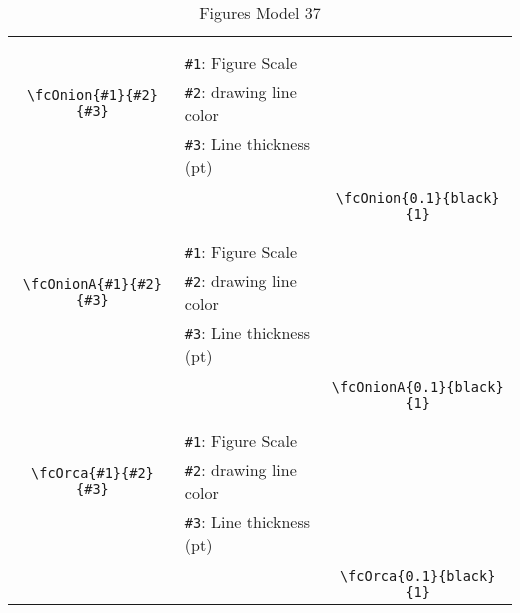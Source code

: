 \documentclass[x11names]{article}
\begin{document}
\begin{table}[H]
\begin{tabular}{|c|l|c|}
	&&\multirow{5}{*}{\fcOnion{0.1}{black}{1}}\\	&&\\	&\verb|#1|: Figure Scale &\\	\verb|\fcOnion{#1}{#2}{#3}|&	\verb|#2|: drawing line color &\\	&\verb|#3|: Line thickness (pt) &\\ &&\\&&	\verb|\fcOnion{0.1}{black}{1}|\\\hline 	
	&&\multirow{5}{*}{\fcOnionA{0.1}{black}{1}}\\	&&\\	&\verb|#1|: Figure Scale &\\	\verb|\fcOnionA{#1}{#2}{#3}|&	\verb|#2|: drawing line color &\\	&\verb|#3|: Line thickness (pt) &\\ &&\\&&	\verb|\fcOnionA{0.1}{black}{1}|\\\hline 	
	&&\multirow{5}{*}{\fcOrca{0.1}{black}{1}}\\	&&\\	&\verb|#1|: Figure Scale &\\	\verb|\fcOrca{#1}{#2}{#3}|&	\verb|#2|: drawing line color &\\	&\verb|#3|: Line thickness (pt) &\\ &&\\&&	\verb|\fcOrca{0.1}{black}{1}|\\\hline 	\hline\end{tabular}\caption{Figures Model 37}\label{tab37}\end{table}
\end{document}
